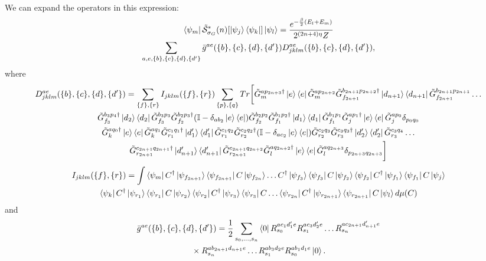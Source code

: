 \documentclass[aps,floatfix,10pt,amssymb,amsfont,amsmath,superscriptaddress,float,nofootinbib,longbibliography,nobalancelastpage,twocolumn]{revtex4-2}
\begin{document}
\begin{widetext}
\begin{multline}
    \label{eq:Bstarexpanded}
\end{multline}
We can expand the operators in this expression:
\begin{multline}
    \bra{\psi_m}\tilde{\mathcal{S}}^*_{\sigma_G}(n)[\ket{\psi_j}\bra{\psi_k}]\ket{\psi_l} = \frac{e^{-\frac{\beta}{2}(E_l+E_m)}}{2^{(2n+4)\eta}Z}\\\sum_{a,e,\{b\},\{c\},\{d\},\{d'\}} \bar g^{ae}(\{b\},\{c\},\{d\},\{d'\}) D^{ae}_{jklm}(\{b\},\{c\},\{d\},\{d'\}),
    \label{eq:B*def}
\end{multline}
where 
\begin{multline}
    D^{ae}_{jklm}(\{b\},\{c\},\{d\},\{d'\}) =  \sum_{\{f\}, \{r\}}  I_{jklm}(\{f\},\{r\})
    \sum_{\{p\},\{q\}}
Tr\bigg[\tilde G^{ap_{2n+3}\dagger}_m\ket{e}\bra{e}\tilde G^{ap_{2n+2}}_m\tilde G^{b_{2n+1}p_{2n+2}\dagger}_{f_{2n+1}}\ket{d_{n+1}}\bra{d_{n+1}}\tilde G^{b_{2n+1}p_{2n+1}}_{f_{2n+1}}\ldots\\ \tilde G^{b_3p_4\dagger}_{f_3}\ket{d_2}\bra{d_2}\tilde G^{b_3p_3}_{f_3}\tilde G^{b_2p_3\dagger}_{f_2}(\mathbb{I} - \delta_{ab_2}\ket{e}\bra{e})\tilde G^{b_2p_2}_{f_2}\tilde G^{b_1p_2\dagger}_{f_1}\ket{d_1}\bra{d_1}\tilde G^{b_1p_1}_{f_1}\tilde G^{ap_1\dagger}_j\ket{e}\bra{e}\tilde G^{ap_0}_j\delta_{p_0q_0}\\
\tilde G^{aq_0\dagger}_k\ket{e}\bra{e}\tilde G^{aq_1}_k\tilde G^{c_1q_1\dagger}_{r_1}\ket{d'_1}\bra{d'_1}\tilde G^{c_1q_2}_{r_1}\tilde G^{c_2q_2\dagger}_{r_2}(\mathbb{I} - \delta_{ac_2}\ket{e}\bra{e})\tilde G^{c_2q_3}_{r_2}\tilde G^{c_3q_3\dagger}_{r_3}\ket{d'_2}\bra{d'_2}\tilde G^{c_3q_4}_{r_3}\ldots\\
\tilde G^{c_{2n+1}q_{2n+1}\dagger}_{r_{2n+1}}\ket{d'_{n+1}}\bra{d'_{n+1}}\tilde G^{c_{2n+1}q_{2n+2}}_{r_{2n+1}}\tilde G^{aq_{2n+2}\dagger}_l\ket{e}\bra{e}\tilde G^{aq_{2n+3}}_l \delta_{p_{2n+3}q_{2n+3}}\bigg]
\end{multline}
\begin{multline}
I_{jklm}(\{f\},\{r\})=\int\bra{\psi_{m}}C^{\dagger}\ket{\psi_{f_{2n+1}}}\bra{\psi_{f_{2n+1}}}C\ket{\psi_{f_{2n}}}\ldots C^{\dagger}\ket{\psi_{f_3}}\bra{\psi_{f_3}}C\ket{\psi_{f_2}}\bra{\psi_{f_2}}C^{\dagger}\ket{\psi_{f_1}}\bra{\psi_{f_1}}C\ket{\psi_j}
\\\bra{\psi_k}C^{\dagger}\ket{\psi_{r_1}}\bra{\psi_{r_1}}C\ket{\psi_{r_2}}\bra{\psi_{r_2}}C^{\dagger}\ket{\psi_{r_3}}\bra{\psi_{r_3}}C\ldots \bra{\psi_{r_{2n}}}C^{\dagger}\ket{\psi_{r_{2n+1}}}\bra{\psi_{r_{2n+1}}}C\ket{\psi_{l}}d\mu(C)
\end{multline}
and
\begin{multline}
       \bar g^{ae}(\{b\},\{c\},\{d\},\{d'\}) = \frac12\sum_{s_0,\ldots,s_n}
       \bra{0}R_{s_0}^{ac_1d'_1e}R_{s_1}^{ac_3d'_2e}\ldots
       R_{s_n}^{ac_{2n+1}d'_{n+1}e}\\
       {}\times R_{s_n}^{ab_{2n+1}d_{n+1}e}\ldots
       R_{s_1}^{ab_3d_2e}R_{s_0}^{ab_1d_1e}\ket{0}.
       \label{eq:gbar-definition}
\end{multline}





\end{widetext}
\end{document}
